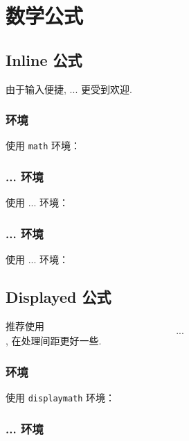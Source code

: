 \chapter{数学公式}

\section{Inline 公式}

由于输入便捷, \texttt{$...$} 更受到欢迎.

\subsection{\protect{} 环境}

使用 \texttt{math} 环境：


\subsection{\protect\verbum*{(}...\protect\verbum*{)} 环境}

使用 \texttt{\(...\)} 环境：


\subsection{\protect\verbum{\$}...\protect\verbum{\$} 环境}

使用 \texttt{$...$} 环境：


\section{Displayed 公式}

推荐使用 \texttt{\[...\]}, 在处理间距更好一些.

\subsection{\protect{} 环境}

使用 \texttt{displaymath} 环境：


\subsection{\protect\verbum*{[}...\protect\verbum*{]} 环境}

